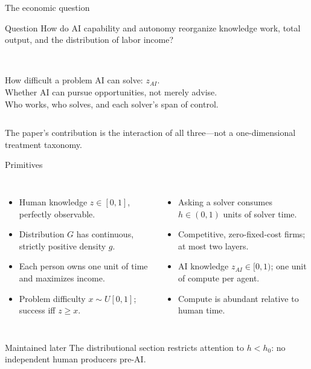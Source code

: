\documentclass[aspectratio=169,10pt]{beamer}
\begin{document}
\begin{frame}{The economic question}
\small
\begin{block}{Question}
How do AI capability and autonomy reorganize knowledge work, total output, and the distribution of labor income?
\end{block}
\vspace{.25cm}
\begin{columns}[T,onlytextwidth]
\\[.18cm]How difficult a problem AI can solve: $z_{AI}$.
\\[.18cm]Whether AI can pursue opportunities, not merely advise.
\\[.18cm]Who works, who solves, and each solver's span of control.
\end{columns}
\vfill
The paper's contribution is the interaction of all three—not a one-dimensional treatment taxonomy.
\end{frame}

\begin{frame}{Primitives}
\small
\begin{columns}[T,onlytextwidth]
\begin{itemize}
\item Human knowledge $z\in[0,1]$, perfectly observable.
\item Distribution $G$ has continuous, strictly positive density $g$.
\item Each person owns one unit of time and maximizes income.
\item Problem difficulty $x\sim U[0,1]$; success iff $z\ge x$.
\end{itemize}
\begin{itemize}
\item Asking a solver consumes $h\in(0,1)$ units of solver time.
\item Competitive, zero-fixed-cost firms; at most two layers.
\item AI knowledge $z_{AI}\in[0,1)$; one unit of compute per agent.
\item Compute is abundant relative to human time.
\end{itemize}
\end{columns}
\vfill
\begin{alertblock}{Maintained later}
The distributional section restricts attention to $h<h_0$: no independent human producers pre-AI.
\end{alertblock}
\end{frame}
\end{document}
